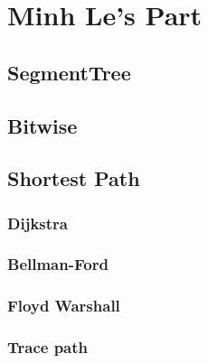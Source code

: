 \chapter{Minh Le's Part}

\section{SegmentTree}

\section{Bitwise}
	
\section{Shortest Path}
	\subsection{Dijkstra}
	\subsection{Bellman-Ford}
	\subsection{Floyd Warshall}
	\subsection{Trace path}
